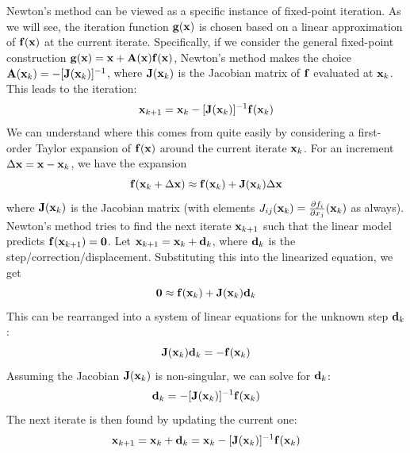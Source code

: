 Newton's method can be viewed as a specific instance of fixed-point iteration. As we will see, the iteration function $\mathbf{g}(\mathbf{x})$ is chosen based on a linear approximation of $\mathbf{f}(\mathbf{x})$ at the current iterate. Specifically, if we consider the general fixed-point construction $\mathbf{g}(\mathbf{x}) = \mathbf{x} + \mathbf{A}(\mathbf{x})\mathbf{f}(\mathbf{x})$, Newton's method makes the choice $\mathbf{A}(\mathbf{x}_k) = -[\mathbf{J}(\mathbf{x}_k)]^{-1}$, where $\mathbf{J}(\mathbf{x}_k)$ is the Jacobian matrix of $\mathbf{f}$ evaluated at $\mathbf{x}_k$. This leads to the iteration:
\begin{equation}
    \mathbf{x}_{k+1} = \mathbf{x}_k - [\mathbf{J}(\mathbf{x}_k)]^{-1} \mathbf{f}(\mathbf{x}_k)
\end{equation}
We can understand where this comes from quite easily by considering a first-order Taylor expansion of $\mathbf{f}(\mathbf{x})$ around the current iterate $\mathbf{x}_k$. For an increment $\Delta\mathbf{x} = \mathbf{x} - \mathbf{x}_k$, we have the expansion
\begin{equation}
    \mathbf{f}(\mathbf{x}_k + \Delta\mathbf{x}) \approx \mathbf{f}(\mathbf{x}_k) + \mathbf{J}(\mathbf{x}_k) \Delta\mathbf{x}
\end{equation}
where $\mathbf{J}(\mathbf{x}_k)$ is the Jacobian matrix (with elements $J_{ij}(\mathbf{x}_k) = \tfrac{\partial f_i}{\partial x_j}(\mathbf{x}_k)$ as always). Newton's method tries to find the next iterate $\mathbf{x}_{k+1}$ such that the linear model predicts $\mathbf{f}(\mathbf{x}_{k+1}) = \mathbf{0}$. Let $\mathbf{x}_{k+1} = \mathbf{x}_k + \mathbf{d}_k$, where $\mathbf{d}_k$ is the step/correction/displacement. Substituting this into the linearized equation, we get
\begin{equation}
    \mathbf{0} \approx \mathbf{f}(\mathbf{x}_k) + \mathbf{J}(\mathbf{x}_k) \mathbf{d}_k
\end{equation}
This can be rearranged into a system of linear equations for the unknown step $\mathbf{d}_k$:
\begin{equation}
    \mathbf{J}(\mathbf{x}_k) \mathbf{d}_k = -\mathbf{f}(\mathbf{x}_k)
\end{equation}
Assuming the Jacobian $\mathbf{J}(\mathbf{x}_k)$ is non-singular, we can solve for $\mathbf{d}_k$:
\begin{equation}
    \mathbf{d}_k = -[\mathbf{J}(\mathbf{x}_k)]^{-1} \mathbf{f}(\mathbf{x}_k)
\end{equation}
The next iterate is then found by updating the current one:
\begin{equation}
    \mathbf{x}_{k+1} = \mathbf{x}_k + \mathbf{d}_k = \mathbf{x}_k - [\mathbf{J}(\mathbf{x}_k)]^{-1} \mathbf{f}(\mathbf{x}_k)
\end{equation}
